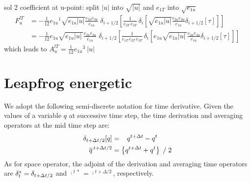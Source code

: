 \documentclass[../tex_main/NEMO_manual]{subfiles}
\begin{document}
sol 2 coefficient at u-point: split $|u|$ into $\sqrt{|u|}$ and $e_{1T}$ into $\sqrt{e_{1u}}$
\begin{equation} \label{eq:tra_adv_ubs2}
\begin{split}
F_u^{lT}
&= - \frac{1}{12} {e_{1u}}^1 \sqrt{e_{1u}|u|} \frac{e_{2u} e_{3u}}{e_{1u}}\;\delta_{i+1/2}\left[ \frac{1}{e_{2T}\,e_{3T}}\,\delta_i \left[ \sqrt{e_{1u}|u|} \frac{e_{2u} e_{3u} }{e_{1u} } \delta_{i+1/2}[\tau] \right] \right] \\
&= - \frac{1}{12} e_{1u} \sqrt{e_{1u}|u|\,} \frac{e_{2u} e_{3u}}{e_{1u}}\;\delta_{i+1/2}\left[ \frac{1}{e_{1T}\,e_{2T}\,e_{3T}}\,\delta_i \left[ e_{1u} \sqrt{e_{1u}|u|\,} \frac{e_{2u} e_{3u} }{e_{1u}} \delta_{i+1/2}[\tau] \right] \right]
\end{split}
\end{equation}
which leads to ${A_u^{lT}} = \frac{1}{12} {e_{1u}}^3\ |u|$


\section{Leapfrog energetic}
\label{sec:LF}

We adopt the following semi-discrete notation for time derivative.
Given the values of a variable $q$ at successive time step,
the time derivation and averaging operators at the mid time step are:
\begin{subequations} \label{eq:dt_mt}
\begin{align}
 \delta_{t+\Delta t/2} [q]     &=  \  \ \,   q^{t+\Delta t}  - q^{t}		\\
 \overline q^{\,t+\Delta t/2} &= \left\{ q^{t+\Delta t} + q^{t} \right\} \; / \; 2
\end{align}
\end{subequations}
As for space operator,
the adjoint of the derivation and averaging time operators are $\delta_t^*=\delta_{t+\Delta t/2}$ and
$\overline{\cdot}^{\,t\,*}= \overline{\cdot}^{\,t+\Delta/2}$, respectively.
\end{document}
